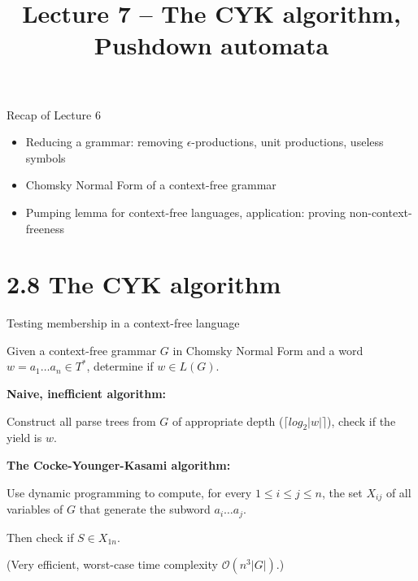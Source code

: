 \documentclass[handout]{beamer}
\title{Lecture 7 -- The CYK algorithm, Pushdown automata}
\begin{document}
\frame{\titlepage}


\begin{frame}{Recap of Lecture 6}
	
    \begin{itemize}
		\item Reducing a grammar: removing $\epsilon$-productions, unit productions, useless symbols
		\item Chomsky Normal Form of a context-free grammar
		\item Pumping lemma for context-free languages, application: proving non-context-freeness		
	\end{itemize}
	
\end{frame}


\section{2.8 The CYK algorithm}


\begin{frame}{Testing membership in a context-free language}

	Given a context-free grammar $G$ \alert{in Chomsky Normal Form} and a word $w=a_1\dots a_n\in T^*$, determine if $w\in L(G)$.

	\bigskip

	\textbf{Naive, inefficient algorithm:}
	
	Construct all parse trees from $G$ of appropriate depth ($\lceil log_2|w|\rceil$), check if the yield is $w$.

	\bigskip


	\textbf{The Cocke-Younger-Kasami algorithm:} 
	
	Use \alert{dynamic programming} to compute, for every $1\leq i\leq j\leq n$, the set $X_{ij}$ of all variables of $G$ that generate the subword $a_i\dots a_j$.

	Then check if $S\in X_{1n}$.

	(Very efficient, worst-case time complexity $\mathcal O(n^3|G|)$.)

\end{frame}
\end{document}

